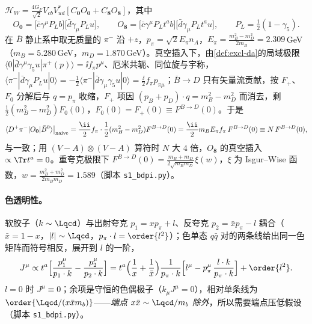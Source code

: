 \begin{example}[朴素因子化与归一化 $N$]\label{ex:heavy-naive}
$\mathcal H_W=\frac{4G_F}{\sqrt2}V_{cb}V_{ud}^*[C_{\mathbf 0}O_{\mathbf 0}+C_{\mathbf 8}O_{\mathbf 8}]$，其中\cite[式~(2)]{BauerPirjolStewart2001}
\begin{equation}\label{eq:heavy-O08}
O_{\mathbf 0}=\big[\bar c\gamma^\mu P_Lb\big]\big[\bar d\gamma_\mu P_Lu\big],\qquad
O_{\mathbf 8}=\big[\bar c\gamma^\mu P_Lt^ab\big]\big[\bar d\gamma_\mu P_Lt^au\big],\qquad P_L=\tfrac12(1-\gamma_5).
\end{equation}
在 $\bar B$ 静止系中取无质量的 $\pi^-$ 沿 $+z$，$p_\pi=\sqrt2E_\pi n_A$，$E_\pi=\frac{m_B^2-m_D^2}{2m_B}=2.309$\,GeV（$m_B=5.280$\,GeV，$m_D=1.870$\,GeV\cite{ParticleDataGroup:2024cfk}）。真空插入下，由\cref{def:excl-da}的局域极限 $\langle0|\bar d\gamma^\mu\gamma_5u|\pi^+(p)\rangle=\ii f_\pi p^\mu$、厄米共轭、同位旋与宇称，$\langle\pi^-|\bar d\gamma_\mu P_Lu|0\rangle=-\frac12\langle\pi^-|\bar d\gamma_\mu\gamma_5u|0\rangle=\frac{\ii}{2}f_\pi p_{\pi\mu}$；$\bar B\to D$ 只有矢量流贡献，按 $F_+$、$F_0$ 分解后与 $q=p_\pi$ 收缩，$F_+$ 项因 $(p_B+p_D)\cdot q=m_B^2-m_D^2$ 而消去，剩 $\frac12(m_B^2-m_D^2)F_0(0)$，$F_0(0)=F_+(0)\equiv F^{B\to D}(0)$。于是
\begin{equation}\label{eq:heavy-naive}
\langle D^+\pi^-|O_{\mathbf 0}|\bar B^0\rangle\big|_{\rm naive}=\frac{\ii}{2}f_\pi\cdot\frac12(m_B^2-m_D^2)F^{B\to D}(0)=\frac{\ii}{2}m_BE_\pi f_\pi\,F^{B\to D}(0)\equiv N\,F^{B\to D}(0),
\end{equation}
与\cite[式~(8)]{BauerPirjolStewart2001}一致；用 $(V-A)\otimes(V-A)$ 算符时 $N$ 大 $4$ 倍，$O_{\mathbf 8}$ 的真空插入 $\propto\Tr t^a=0$。重夸克极限下 $F^{B\to D}(0)=\frac{m_B+m_D}{2\sqrt{m_Bm_D}}\xi(w)$，$\xi$ 为 Isgur--Wise 函数，$w=\frac{m_B^2+m_D^2}{2m_Bm_D}=1.589$（脚本 \texttt{s1\_\allowbreak bdpi.py}）。
\end{example}

\paragraph{色透明性。}
软胶子（$k\sim\Lqcd$）与出射夸克 $p_1=xp_\pi+l$、反夸克 $p_2=\bar xp_\pi-l$ 耦合（$\bar x=1-x$，$|l|\sim\Lqcd$，$p_\pi\cdot l=\order{l^2}$）；色单态 $q\bar q$ 对的两条线给出同一色矩阵而符号相反，展开到 $l$ 的一阶，
\begin{equation}\label{eq:heavy-dipole}
J^\mu\propto t^a\Big[\frac{p_1^\mu}{p_1\cdot k}-\frac{p_2^\mu}{p_2\cdot k}\Big]
=t^a\Big(\frac1x+\frac1{\bar x}\Big)\frac{1}{p_\pi\cdot k}\Big[l^\mu-p_\pi^\mu\,\frac{l\cdot k}{p_\pi\cdot k}\Big]+\order{l^2}.
\end{equation}
$l=0$ 时 $J^\mu\equiv0$；余项是守恒的色偶极子（$k_\mu J^\mu=0$），相对单条线为 $\order{\Lqcd/(x\bar xm_b)}$——\emph{端点 $x\bar x\sim\Lqcd/m_b$ 除外}，所以需要端点压低假设（脚本 \texttt{s1\_\allowbreak bdpi.py}）。

